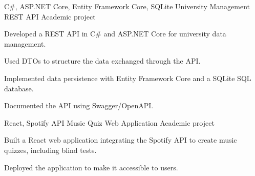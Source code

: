 
\begin{cventries}
  \cventry
    {C\#, ASP.NET Core, Entity Framework Core, SQLite}
    {University Management REST API}
    {Academic project}
    {}
    {
      \begin{cvitems}
        \item {Developed a REST API in C\# and ASP.NET Core for university data management.}
        \item {Used DTOs to structure the data exchanged through the API.}
        \item {Implemented data persistence with Entity Framework Core and a SQLite SQL database.}
        \item {Documented the API using Swagger/OpenAPI.}
      \end{cvitems}
    }
  \cventry
    {React, Spotify API}
    {Music Quiz Web Application}
    {Academic project}
    {}
    {
      \begin{cvitems}
        \item {Built a React web application integrating the Spotify API to create music quizzes, including blind tests.}
        \item {Deployed the application to make it accessible to users.}
      \end{cvitems}
    }
\end{cventries}
